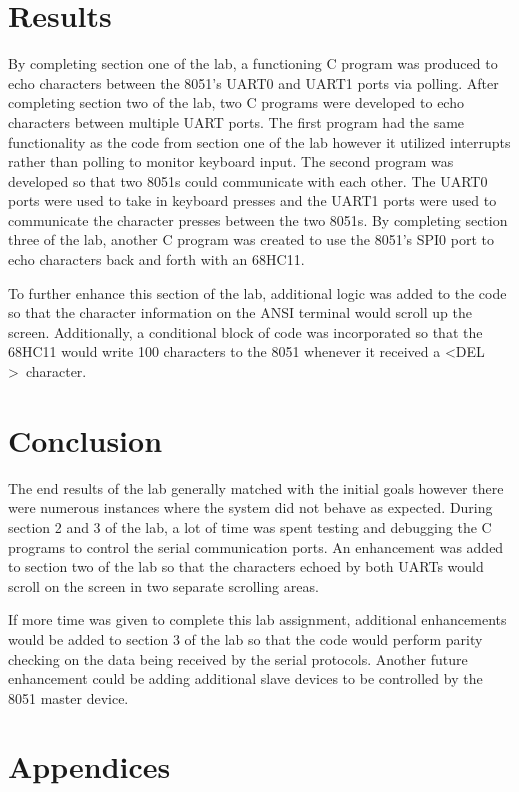 \documentclass[12pt]{article}
\begin{document}
\section{Results}

By completing section one of the lab, a functioning C program was produced to echo characters between the 8051’s UART0 and UART1 ports via polling. After completing section two of the lab, two C programs were developed to echo characters between multiple UART ports. The first program had the same functionality as the code from section one of the lab however it utilized interrupts rather than polling to monitor keyboard input. The second program was developed so that two 8051s could communicate with each other. The UART0 ports were used to take in keyboard presses and the UART1 ports were used to communicate the character presses between the two 8051s. By completing section three of the lab, another C program was created to use the 8051’s SPI0 port to echo characters back and forth with an 68HC11. 

To further enhance this section of the lab, additional logic was added to the code so that the character information on the ANSI terminal would scroll up the screen. Additionally, a conditional block of code was incorporated so that the 68HC11 would write 100 characters to the 8051 whenever it received a \textless DEL \textgreater\ character. 


\section{Conclusion}

The end results of the lab generally matched with the initial goals however there were numerous instances where the system did not behave as expected. During section 2 and 3 of the lab, a lot of time was spent testing and debugging the C programs to control the serial communication ports. An enhancement was added to section two of the lab so that the characters echoed by both UARTs would scroll on the screen in two separate scrolling areas. 

If more time was given to complete this lab assignment, additional enhancements would be added to section 3 of the lab so that the code would perform parity checking on the data being received by the serial protocols. Another future enhancement could be adding additional slave devices to be controlled by the 8051 master device.   




\pagebreak
\section{Appendices}
\end{document}
